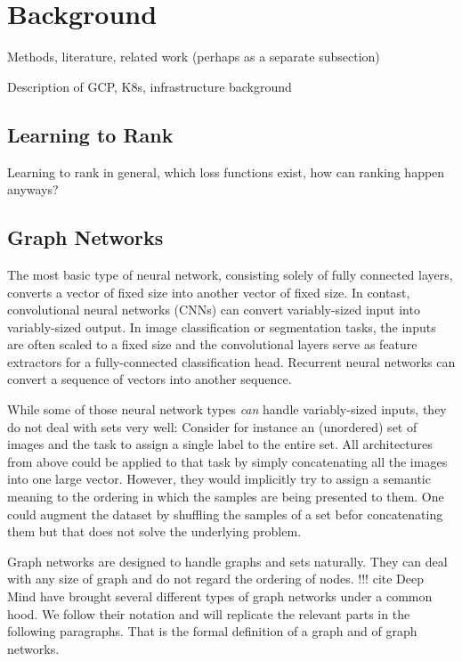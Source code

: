 \section{Background}

Methods, literature, related work (perhaps as a separate subsection)

Description of GCP, K8s, infrastructure background

\subsection{Learning to Rank}
Learning to rank in general, which loss functions exist, how can ranking happen anyways?

\subsection{Graph Networks}
The most basic type of neural network, consisting solely of fully connected layers, converts a vector of fixed size into another vector of fixed size.
In contast, convolutional neural networks (CNNs) can convert variably-sized input into variably-sized output. In image classification or segmentation tasks, the inputs are often scaled to a fixed size and the convolutional layers serve as feature extractors for a fully-connected classification head.
Recurrent neural networks can convert a sequence of vectors into another sequence.

While some of those neural network types \textit{can} handle variably-sized inputs, they do not deal with sets very well: Consider for instance an (unordered) set of images and the task to assign a single label to the entire set. All architectures from above could be applied to that task by simply concatenating all the images into one large vector. However, they would implicitly try to assign a semantic meaning to the ordering in which the samples are being presented to them. One could augment the dataset by shuffling the samples of a set befor concatenating them but that does not solve the underlying problem.

Graph networks are designed to handle graphs and sets naturally. They can deal with any size of graph and do not regard the ordering of nodes. !!! cite Deep Mind have brought several different types of graph networks under a common hood. We follow their notation and will replicate the relevant parts in the following paragraphs. That is the formal definition of a graph and of graph networks.

